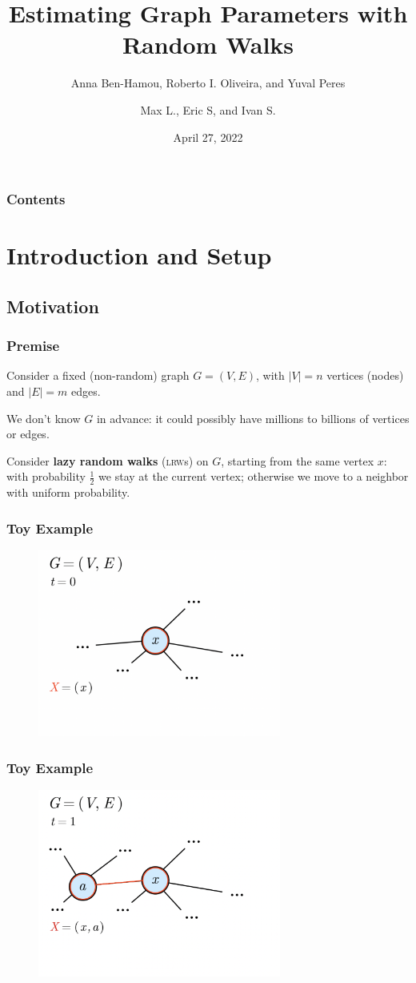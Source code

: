 \documentclass{beamer}
\title{Estimating Graph Parameters with Random Walks}
\subtitle{Anna Ben-Hamou, Roberto I. Oliveira, and Yuval Peres}
\author{Max L., Eric S, and Ivan S.}
\institute{Stat 212}
\date{April 27, 2022}
\begin{document}
\begin{frame}
\titlepage
\end{frame}

\begin{frame}
\frametitle{Contents}
\tableofcontents
\end{frame}


\section{Introduction and Setup}
\subsection{Motivation}
\begin{frame}
\frametitle{Premise}
Consider a fixed (non-random) graph $G=(V,E)$, with $|V|=n$ vertices (nodes) and $|E|=m$ edges.\medskip

We don't know $G$ in advance: it could possibly have millions to billions of vertices or edges.\medskip

Consider \textbf{lazy random walks} (\textsc{lrw}s) on $G$, starting from the same vertex $x$: with probability $\frac{1}{2}$ we stay at the current vertex; otherwise we move to a neighbor with uniform probability.
\end{frame}

\begin{frame}
\frametitle{Toy Example}
\begin{figure}
    \centering
    \includegraphics[trim={0 2cm 0 0}, clip, width=8cm]{diagrams/1.png}
\end{figure}
\end{frame}

\begin{frame}
\frametitle{Toy Example}
\begin{figure}
    \centering
    \includegraphics[trim={0 2cm 0 0}, clip, width=8cm]{diagrams/2.png}
\end{figure}
\end{frame}
\end{document}
